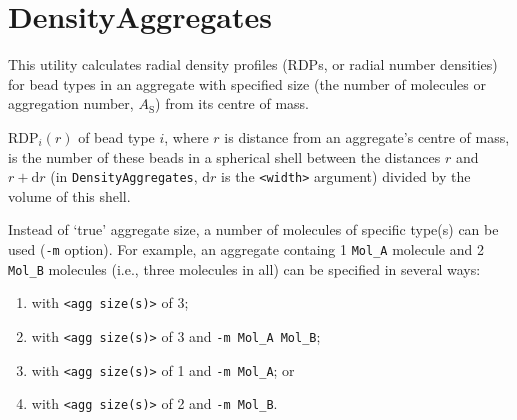 \section{DensityAggregates} \label{sec:DensityAggregates}

This utility calculates radial density profiles (RDPs, or radial number
densities) for bead types in an aggregate with specified size (the number
of molecules or aggregation number, $A_{\mathrm{S}}$) from its centre of
mass.

RDP$_i(r)$ of bead type $i$, where $r$ is distance from an aggregate's
centre of mass, is the number of these beads in a spherical shell between
the distances $r$ and $r+\mathrm{d}r$ (in \texttt{DensityAggregates},
$\mathrm{d}r$ is the \texttt{<width>} argument) divided by the
volume of this shell.

Instead of `true' aggregate size, a number of molecules of specific type(s)
can be used (\texttt{-m} option). For example, an aggregate containg 1
\texttt{Mol\_A} molecule and 2 \texttt{Mol\_B} molecules (i.e., three
molecules in all) can be specified in several ways:
\begin{enumerate}[nosep]
  \item  with \texttt{<agg size(s)>} of 3;
  \item  with \texttt{<agg size(s)>} of 3 and \texttt{-m Mol\_A Mol\_B};
  \item  with \texttt{<agg size(s)>} of 1 and \texttt{-m Mol\_A}; or
  \item  with \texttt{<agg size(s)>} of 2 and \texttt{-m Mol\_B}.
\end{enumerate}

